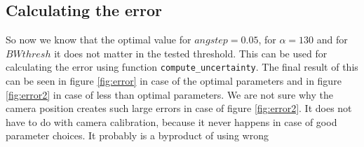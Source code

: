 \documentclass[a4paper, 20pt]{article}
\begin{document}
\begin{figure}[!ht]
\centering
\begin{floatrow}
  
\end{floatrow}
\end{figure}

\FloatBarrier


\subsection{Calculating the error}
So now we know that the optimal value for $angstep = 0.05$, for $\alpha = 130$
and for $BWthresh$ it does not matter in the tested threshold. This can be used for calculating the
error using function \texttt{compute\_uncertainty}. The final result of this
can be seen in figure \ref{fig:error} in case of the optimal parameters
and in figure \ref{fig:error2} in case of less than optimal parameters.
We are not sure why the camera position creates such large errors in case of
figure \ref{fig:error2}. It does not have to do with camera
calibration,
because it never happens in case of good parameter choices. It probably is
a byproduct of using wrong 
\end{document}
